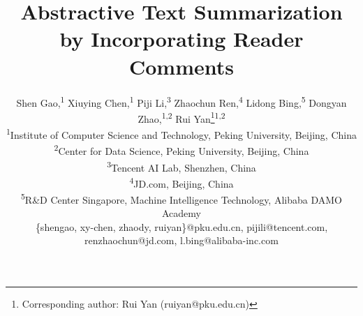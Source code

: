\documentclass[letterpaper]{article} %
\begin{document}
    \title{Abstractive Text Summarization by Incorporating Reader Comments}
    \author{Shen Gao,\textsuperscript{1}
    	Xiuying Chen,\textsuperscript{1}
    	Piji Li,\textsuperscript{3}
    	Zhaochun Ren,\textsuperscript{4}
    	Lidong Bing,\textsuperscript{5}
    	Dongyan Zhao,\textsuperscript{1,2}
    	Rui Yan\thanks{Corresponding author: Rui Yan (ruiyan@pku.edu.cn)}\textsuperscript{1,2}\\
    	\textsuperscript{1}{Institute of Computer Science and Technology, Peking University, Beijing, China} \\
    	\textsuperscript{2}{Center for Data Science, Peking University, Beijing, China}\\
    	\textsuperscript{3}{Tencent AI Lab, Shenzhen, China} \\
    	\textsuperscript{4}{JD.com, Beijing, China} \\
    	\textsuperscript{5}{R\&D Center Singapore, Machine Intelligence Technology, Alibaba DAMO Academy}\\
    	\{shengao, xy-chen, zhaody, ruiyan\}@pku.edu.cn,
    	pijili@tencent.com,
    	renzhaochun@jd.com,
    	l.bing@alibaba-inc.com}
\end{document}
